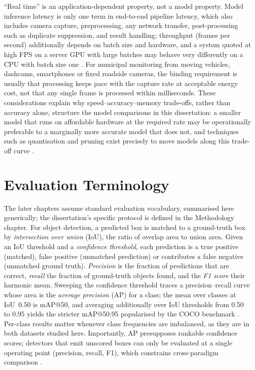 ``Real time'' is an application-dependent property, not a model property. Model inference latency is only one term in end-to-end pipeline latency, which also includes camera capture, preprocessing, any network transfer, post-processing such as duplicate suppression, and result handling; throughput (frames per second) additionally depends on batch size and hardware, and a system quoted at high FPS on a server GPU with large batches may behave very differently on a CPU with batch size one \citep{chen2019deep}. For municipal monitoring from moving vehicles, dashcams, smartphones or fixed roadside cameras, the binding requirement is usually that processing keeps pace with the capture rate at acceptable energy cost, not that any single frame is processed within milliseconds. These considerations explain why speed--accuracy--memory trade-offs, rather than accuracy alone, structure the model comparisons in this dissertation: a smaller model that runs on affordable hardware at the required rate may be operationally preferable to a marginally more accurate model that does not, and techniques such as quantisation and pruning exist precisely to move models along this trade-off curve \citep{han2016deep,jacob2018quantization,howard2017mobilenets}.

\section{Evaluation Terminology}
\label{sec:bg-evaluation}

The later chapters assume standard evaluation vocabulary, summarised here generically; the dissertation's specific protocol is defined in the Methodology chapter. For object detection, a predicted box is matched to a ground-truth box by \emph{intersection over union} (IoU), the ratio of overlap area to union area. Given an IoU threshold and a \emph{confidence threshold}, each prediction is a true positive (matched), false positive (unmatched prediction) or contributes a false negative (unmatched ground truth). \emph{Precision} is the fraction of predictions that are correct, \emph{recall} the fraction of ground-truth objects found, and the \emph{F1 score} their harmonic mean. Sweeping the confidence threshold traces a precision--recall curve whose area is the \emph{average precision} (AP) for a class; the mean over classes at IoU~0.50 is mAP@50, and averaging additionally over IoU thresholds from 0.50 to 0.95 yields the stricter mAP@50:95 popularised by the COCO benchmark \citep{lin2014microsoft,everingham2010pascal,padilla2021comparative}. Per-class results matter whenever class frequencies are imbalanced, as they are in both datasets studied here. Importantly, AP presupposes rankable confidence scores; detectors that emit unscored boxes can only be evaluated at a single operating point (precision, recall, F1), which constrains cross-paradigm comparison \citep{guo2017calibration}.

